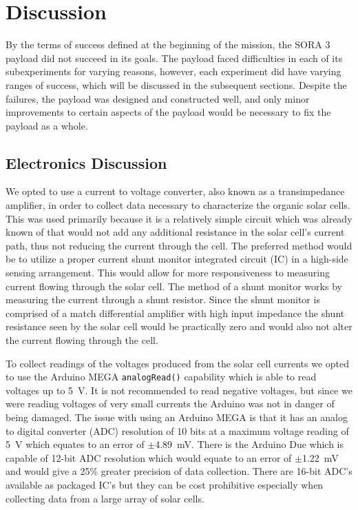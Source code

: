 \section{Discussion}
\label{sec:Discussion}

By the terms of success defined at the beginning of the mission, the SORA 3 payload did not succeed in its goals.
The payload faced difficulties in each of its subexperiments for varying reasons, however, each experiment did have varying ranges of success, which will be discussed in the subsequent sections.
Despite the failures, the payload was designed and constructed well, and only minor improvements to certain aspects of the payload would be necessary to fix the payload as a whole.

\subsection{Electronics Discussion}
\label{subsec:Electronics-Discussion}
We opted to use a current to voltage converter, also known as a transimpedance amplifier, in order to collect data necessary to characterize the organic solar cells.
This was used primarily because it is a relatively simple circuit which was already known of that would not add any additional resistance in the solar cell's current path, thus not reducing the current through the cell.
The preferred method would be to utilize a proper current shunt monitor integrated circuit (IC) in a high-side sensing arrangement.
This would allow for more responsiveness to measuring current flowing through the solar cell.
The method of a shunt monitor works by measuring the current through a shunt resistor.
Since the shunt monitor is comprised of a match differential amplifier with high input impedance the shunt resistance seen by the solar cell would be practically zero and would also not alter the current flowing through the cell.

To collect readings of the voltages produced from the solar cell currents we opted to use the Arduino MEGA \texttt{analogRead()} capability which is able to read voltages up to \SI{5}{\volt}.
It is not recommended to read negative voltages, but since we were reading voltages of very small currents the Arduino was not in danger of being damaged.
The issue with using an Arduino MEGA is that it has an analog to digital converter (ADC) resolution of 10 bits at a maximum voltage reading of \SI{5}{\volt} which equates to an error of $\pm$\SI{4.89}{\milli\volt}.
There is the Arduino Due which is capable of 12-bit ADC resolution which would equate to an error of $\pm$\SI{1.22}{\milli\volt} and would give a 25\% greater precision of data collection.
There are 16-bit ADC's available as packaged IC's but they can be cost prohibitive especially when collecting data from a large array of solar cells.

